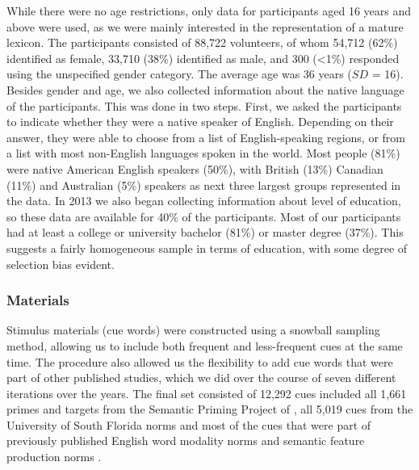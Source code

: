 \documentclass[a4paper,doc,natbib,floatsintext]{apa6}
\begin{document}
While there were no age restrictions, only data for participants aged 16 years and above were used, as we were mainly interested in the representation of a mature lexicon. The participants consisted of 88,722 volunteers, of whom 54,712 (62\%) identified as female, 33,710 (38\%) identified as male, and 300 (<1\%) responded using the unspecified gender category. The average age was 36 years ($SD$ = 16).
Besides gender and age, we also collected information about the native language of the participants. This was done in two steps. First, we asked the participants to indicate whether they were a native speaker of English. Depending on their answer, they were able to choose from a list of English-speaking regions, or from a list with most non-English languages spoken in the world. Most people (81\%) were native American English speakers (50\%), with British (13\%) Canadian (11\%) and Australian (5\%) speakers as next three largest groups represented in the data. In 2013 we also began collecting information about level of education, so these data are available for 40\% of the participants. Most of our participants had at least a college or university bachelor (81\%) or master degree (37\%). This suggests a fairly homogeneous sample in terms of education, with some degree of selection bias evident.


\subsubsection{Materials}

Stimulus materials (cue words) were constructed using a snowball sampling method, allowing us to include both frequent and less-frequent cues at the same time. The procedure also allowed us the flexibility to add cue words that were part of other published studies, which we did over the course of seven different iterations over the years.
The final set consisted of 12,292 cues included all 1,661 primes and targets from the Semantic Priming Project of \cite{HutchisonBalota2013}, all 5,019 cues from the University of South Florida norms \citep{Nelson2004} and most of the cues that were part of previously published English word modality norms \citep{LynottConnnell2013} and semantic feature production norms \citep{McRae2005}.
\end{document}

